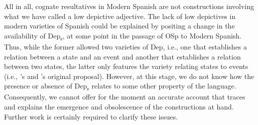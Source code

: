 \documentclass[output=paper,colorlinks,citecolor=brown,
]{langscibook}
\begin{document}

							

All in all, cognate resultatives in Modern Spanish are not constructions involving what we have called a low depictive adjective. The lack of low depictives in modern varieties of Spanish could be explained  by positing a change in the availability of Dep\textsubscript{s},   at some point in the passage of OSp to Modern Spanish.  Thus,  while the former allowed two varieties of Dep, i.e., one that establishes a relation between a state and an event and another that establishes a relation between two states, the latter only features the variety relating states to events (i.e., \citeauthor{Geuder2000}’s \citeyear{Geuder2000} and \citeauthor{Pylkkanen2008}’s \citeyear{Pylkkanen2008} original proposal). However, at this stage, we do not know how the presence or absence of Dep\textsubscript{s} relates to some other property of the language. Consequently, we cannot offer for the moment an accurate account that traces and explains the emergence and obsolescence of the constructions at hand. Further work is certainly required to clarify these issues.
\end{document}
